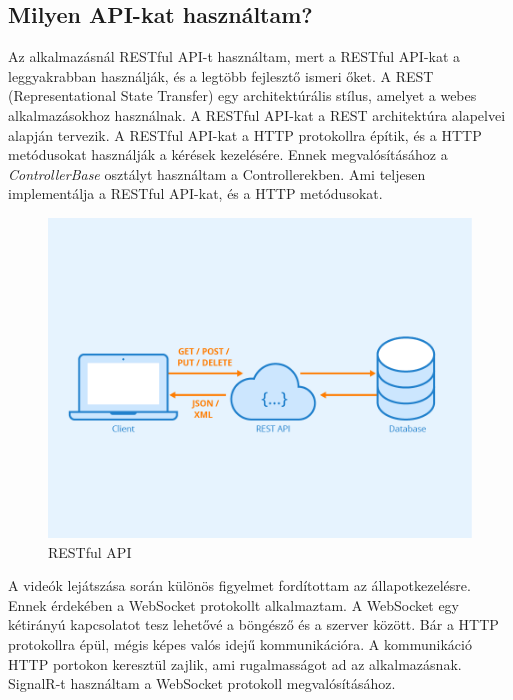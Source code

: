 \subsection*{Milyen API-kat használtam?}
Az alkalmazásnál RESTful API-t használtam, mert a RESTful API-kat a leggyakrabban használják,
és a legtöbb fejlesztő ismeri őket. A REST (Representational State Transfer) egy architektúrális stílus,
amelyet a webes alkalmazásokhoz használnak. A RESTful API-kat a REST architektúra alapelvei alapján tervezik.
A RESTful API-kat a HTTP protokollra építik, és a HTTP metódusokat használják a kérések kezelésére.
Ennek megvalósításához a \textit{ControllerBase} osztályt használtam a Controllerekben.
Ami teljesen implementálja a RESTful API-kat, és a HTTP metódusokat.

\begin{figure}[H]
    \centering
    \includegraphics[width=9.0truecm]{images/Rest-API.png}
    \caption{RESTful API}\footnotemark
    \label{fig:restful_api}
\end{figure}

A videók lejátszása során különös figyelmet fordítottam
az állapotkezelésre. Ennek érdekében a WebSocket
protokollt alkalmaztam. A WebSocket egy kétirányú
kapcsolatot tesz lehetővé a böngésző és a szerver között.
Bár a HTTP protokollra épül, mégis képes valós idejű
kommunikációra. A kommunikáció HTTP portokon keresztül zajlik,
ami rugalmasságot ad az alkalmazásnak.
SignalR-t használtam a WebSocket protokoll megvalósításához.

